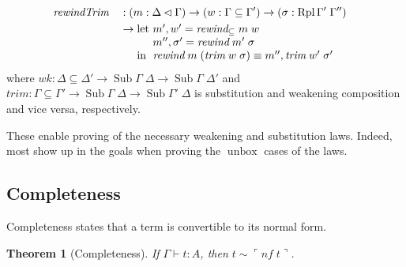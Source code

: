\documentclass{article}
\newtheorem{theorem}{Theorem}
\theoremstyle{definition}\newtheorem{definition}{Definition}
\DeclareMathOperator\unbox{unbox}
\begin{document}
\begin{itemize}
\begin{align*}
\begin{array}[t]{@{}l@{}l@{}}
    \end{array} \\
    &\textit{rewindTrim} &&: (m : \Delta\lhd\Gamma) \to (w : \Gamma \subseteq \Gamma') \to (\sigma : \operatorname{Rpl} \Gamma' \; \Gamma'') \\
    &&&\to
    \begin{array}[t]{@{}l@{}l@{}}
      \text{let } & m' , w' = \textit{rewind}_\subseteq \; m \; w \\
      & m'' , \sigma' = \textit{rewind} \; m' \; \sigma \\
      \text{in } & \textit{rewind} \; m \; (\textit{trim} \; w \; \sigma) \equiv m'' , \textit{trim} \; w' \; \sigma'
    \end{array}
  \end{align*}
  where $\textit{wk} : \Delta\subseteq\Delta' \to \operatorname{Sub} \Gamma \; \Delta \to \operatorname{Sub} \Gamma \; \Delta'$ and
  $\textit{trim} : \Gamma\subseteq\Gamma' \to \operatorname{Sub} \Gamma \; \Delta \to \operatorname{Sub} \Gamma' \; \Delta$
  is substitution and weakening composition and vice versa, respectively.
\end{itemize}
These enable proving of the necessary weakening and substitution laws.
Indeed, most show up in the goals when proving the $\unbox$ cases of the laws.

\subsection{Completeness}

Completeness states that a term is convertible to its normal form.
\begin{theorem}[Completeness]
  If $\Gamma \vdash t : A$, then $t \sim \ulcorner \textit{nf} \; t \urcorner$.
\end{theorem}
\end{document}
